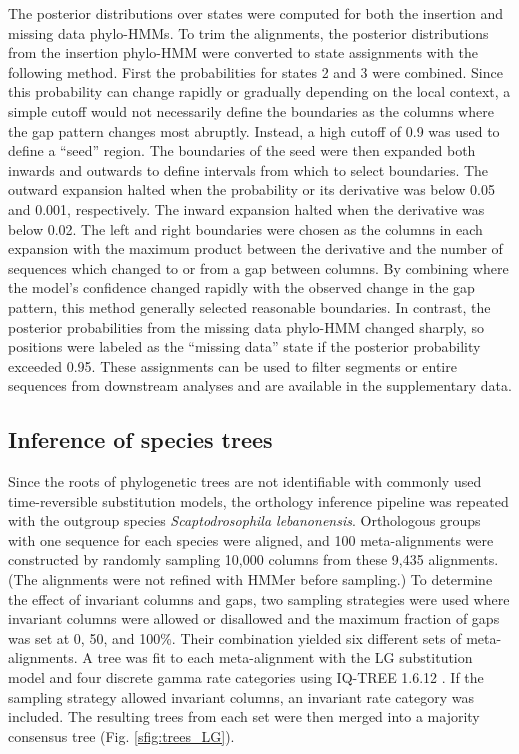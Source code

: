 \documentclass[10pt,letterpaper]{article}
\begin{document}
The posterior distributions over states were computed for both the insertion and missing data phylo-HMMs. To trim the alignments, the posterior distributions from the insertion phylo-HMM were converted to state assignments with the following method. First the probabilities for states 2 and 3 were combined. Since this probability can change rapidly or gradually depending on the local context, a simple cutoff would not necessarily define the boundaries as the columns where the gap pattern changes most abruptly. Instead, a high cutoff of 0.9 was used to define a “seed” region. The boundaries of the seed were then expanded both inwards and outwards to define intervals from which to select boundaries. The outward expansion halted when the probability or its derivative was below 0.05 and 0.001, respectively. The inward expansion halted when the derivative was below 0.02. The left and right boundaries were chosen as the columns in each expansion with the maximum product between the derivative and the number of sequences which changed to or from a gap between columns. By combining where the model’s confidence changed rapidly with the observed change in the gap pattern, this method generally selected reasonable boundaries. In contrast, the posterior probabilities from the missing data phylo-HMM changed sharply, so positions were labeled as the ``missing data'' state if the posterior probability exceeded 0.95. These assignments can be used to filter segments or entire sequences from downstream analyses and are available in the supplementary data.

\subsection*{Inference of species trees}
Since the roots of phylogenetic trees are not identifiable with commonly used time-reversible substitution models, the orthology inference pipeline was repeated with the outgroup species \textit{Scaptodrosophila lebanonensis}. Orthologous groups with one sequence for each species were aligned, and 100 meta-alignments were constructed by randomly sampling 10,000 columns from these 9,435 alignments. (The alignments were not refined with HMMer before sampling.) To determine the effect of invariant columns and gaps, two sampling strategies were used where invariant columns were allowed or disallowed and the maximum fraction of gaps was set at 0, 50, and 100\%. Their combination yielded six different sets of meta-alignments. A tree was fit to each meta-alignment with the LG substitution model and four discrete gamma rate categories using IQ-TREE 1.6.12 \cite{Nguyen2014, Le2008, Yang1994}. If the sampling strategy allowed invariant columns, an invariant rate category was included. The resulting trees from each set were then merged into a majority consensus tree (Fig. \ref{sfig:trees_LG}).
\end{document}

